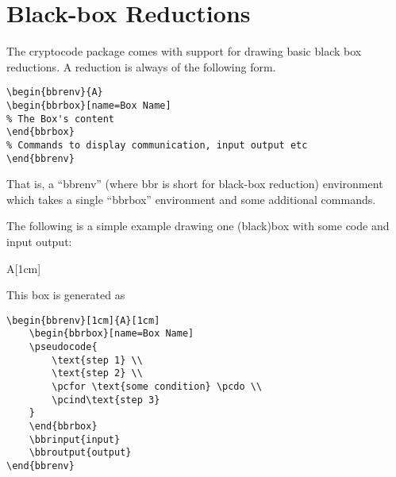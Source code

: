 \documentclass[a4paper]{report}
\begin{document}
\chapter{Black-box Reductions}
\label{chap:bbr}

The cryptocode package comes with support for drawing basic black box reductions. A reduction is
always of the following form.

\begin{lstlisting}
\begin{bbrenv}{A}
\begin{bbrbox}[name=Box Name]
% The Box's content
\end{bbrbox}
% Commands to display communication, input output etc
\end{bbrenv}
\end{lstlisting}
That is, a \enquote{bbrenv} (where bbr is short for black-box reduction) environment which takes a single
\enquote{bbrbox} environment and some additional commands. 

The following is a simple example drawing one (black)box with some code and input output:

\begin{bbrenv}[1cm]{A}[1cm]
	\begin{bbrbox}[name=Box Name]
	\end{bbrbox}
\end{bbrenv}

This box is generated as
\begin{lstlisting}
\begin{bbrenv}[1cm]{A}[1cm]
	\begin{bbrbox}[name=Box Name]
	\pseudocode{
		\text{step 1} \\
		\text{step 2} \\
		\pcfor \text{some condition} \pcdo \\
		\pcind\text{step 3} 
	}
	\end{bbrbox}
	\bbrinput{input}
	\bbroutput{output}
\end{bbrenv}
\end{lstlisting}
\end{document}
